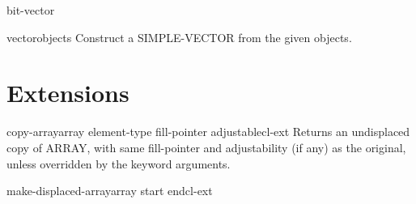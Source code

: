 \begin{class}{bit-vector}{}{}{}
  
\end{class}

\begin{class}{vector}{\rest objects}{}{}
  Construct a SIMPLE-VECTOR from the given objects.
\end{class}

\section{Extensions}
\label{sec:extensions}

\begin{function}{copy-array}{array \key element-type fill-pointer adjustable}{cl-ext}{}
  Returns an undisplaced copy of ARRAY, with same fill-pointer
and adjustability (if any) as the original, unless overridden by
the keyword arguments.
\end{function}

\begin{function}{make-displaced-array}{array \op start end}{cl-ext}{}
  
\end{function}

